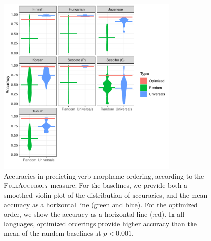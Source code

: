 \documentclass[11pt,letterpaper]{article}
\begin{document}
%
%
%
\begin{figure}[]
    \centering
\includegraphics[width=0.8\textwidth]{figures/accuracies_verbs_full.pdf}
    \caption{Accuracies in predicting verb morpheme ordering, according to the \textsc{FullAccuracy} measure.
    For the baselines, we provide both a smoothed violin plot of the distribution of accuracies, and the mean accuracy as a horizontal line (green and blue). For the optimized order, we show the accuracy as a horizontal line (red).
    In all languages, optimized orderings provide higher accuracy than the mean of the random baselines at $p<0.001$.}
    \label{tab:optimized_acc_verbs_full}
\end{figure}
%
\end{document}
